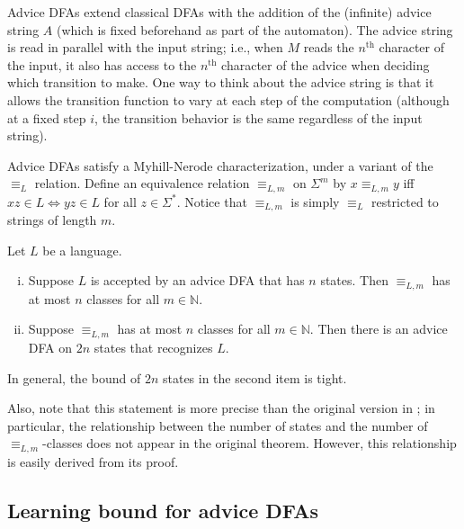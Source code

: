 \documentclass[runningheads]{llncs}
\newcommand{\bb}{\mathbb}
\newif\ifappendix
\begin{document}
Advice DFAs extend classical DFAs with the addition of the (infinite) advice string $A$ (which is fixed beforehand as part of the automaton). 
The advice string is read in parallel with the input string; i.e., when $M$ reads the $n^\text{th}$ character of the input, it also has access to the $n^\text{th}$ character of the advice when deciding which transition to make.
One way to think about the advice string is that it allows the transition function to vary at each step of the computation (although at a fixed step $i$, the transition behavior is the same regardless of the input string).

Advice DFAs satisfy a Myhill-Nerode characterization, under a variant of the $\equiv_L$ relation.
Define an equivalence relation $\equiv_{L,m}$ on $\Sigma^m$ by $x \equiv_{L,m} y$ iff $xz \in L \iff yz \in L$ for all $z \in \Sigma^*$. Notice that $\equiv_{L,m}$ is simply $\equiv_L$ restricted to strings of length $m$. 

\begin{theorem} \label{thm:advice myhill-nerode with bounds}
    Let $L$ be a language.
    \begin{enumerate}[(i)]
        \item Suppose $L$ is accepted by an advice DFA that has $n$ states. 
        Then $\equiv_{L,m}$ has at most $n$ classes for all $m \in \bb N$. 
        
        \item Suppose $\equiv_{L,m}$ has at most $n$ classes for all $m \in \bb N$. 
        Then there is an advice DFA on $2n$ states that recognizes $L$.
    \end{enumerate}
\end{theorem}

In general, the bound of $2n$ states in the second item is tight.
\ifappendix A example witnesing this is given in Appendix \ref{appendix:witness to tightness of advice myhill-nerode bounds}. \fi
Also, note that this statement is more precise than the original version in \cite{kruckman-etal:myhill-nerode-automata-advice}; in particular, the relationship between the number of states and the number of $\equiv_{L,m}$-classes does not appear in the original theorem. 
However, this relationship is easily derived from its proof.



\subsection{Learning bound for advice DFAs}
\end{document}

